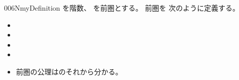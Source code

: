 \documentclass[index]{subfiles}
\begin{document}
\begin{myBlock}{006N}{myDefinition}
  を階数、
  を前圏とする。
  前圏を
  次のように定義する。
  \begin{itemize}
  \item {}
  \item {}
  \item {}
  \item {}
  \item 前圏の公理はのそれから分かる。
  \end{itemize}
\end{myBlock}
\end{document}
